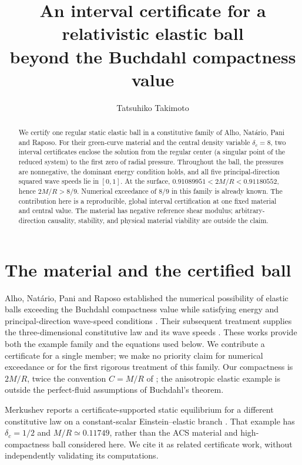 \documentclass[11pt]{article}
\title{An interval certificate for a relativistic elastic ball\\beyond the Buchdahl compactness value}
\author{Tatsuhiko Takimoto}
\date{}
\begin{document}
\maketitle
\begin{abstract}
We certify one regular static elastic ball in a constitutive family of Alho, Nat\'ario, Pani and Raposo. For their green-curve material and the central density variable $\delta_c=8$, two interval certificates enclose the solution from the regular center (a singular point of the reduced system) to the first zero of radial pressure. Throughout the ball, the pressures are nonnegative, the dominant energy condition holds, and all five principal-direction squared wave speeds lie in $[0,1]$. At the surface, $0.91089951<2M/R<0.91180552$, hence $2M/R>8/9$. Numerical exceedance of $8/9$ in this family is already known. The contribution here is a reproducible, global interval certification at one fixed material and central value. The material has negative reference shear modulus; arbitrary-direction causality, stability, and physical material viability are outside the claim.
\end{abstract}

\section{The material and the certified ball}
Alho, Nat\'ario, Pani and Raposo established the numerical possibility of elastic balls exceeding the Buchdahl compactness value while satisfying energy and principal-direction wave-speed conditions \cite{ANPR22}. Their subsequent treatment supplies the three-dimensional constitutive law and its wave speeds \cite{ANPR24}. These works provide both the example family and the equations used below. We contribute a certificate for a single member; we make no priority claim for numerical exceedance or for the first rigorous treatment of this family. Our compactness is $2M/R$, twice the convention $C=M/R$ of \cite{ANPR22}; the anisotropic elastic example is outside the perfect-fluid assumptions of Buchdahl's theorem.

Merkushev reports a certificate-supported static equilibrium for a different constitutive law on a constant-scalar Einstein--elastic branch \cite{Merkushev26}. That example has $\delta_c=1/2$ and $M/R\simeq0.11749$, rather than the ACS material and high-compactness ball considered here. We cite it as related certificate work, without independently validating its computations.
\end{document}
